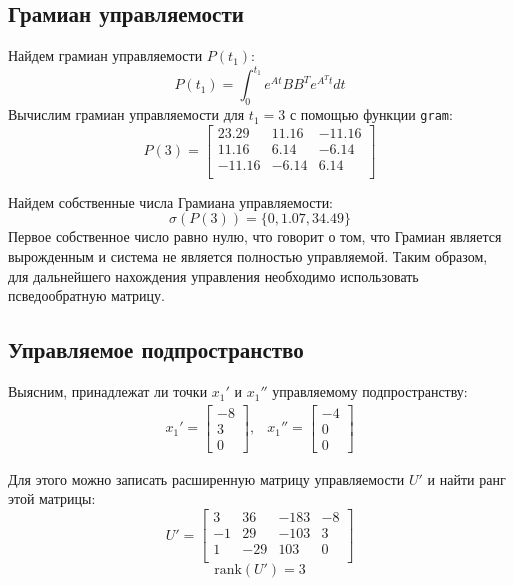 \subsection{Грамиан управляемости}
Найдем грамиан управляемости $P(t_1)$:
\begin{equation}
    P(t_1) = \int_{0}^{t_1} e^{At}BB^Te^{A^Tt}dt
\end{equation}
Вычислим грамиан управляемости для $t_1 = 3$ с помощью функции \texttt{gram}: 
\begin{equation}
    P(3) = \begin{bmatrix}
        23.29 & 11.16 & -11.16 \\ 
        11.16 & 6.14 & -6.14 \\ 
        -11.16 & -6.14 & 6.14 \\ 
    \end{bmatrix}
\end{equation}

Найдем собственные числа Грамиана управляемости:
\begin{equation}
   \sigma(P(3)) = \{0, 1.07, 34.49 \}
\end{equation}
Первое собственное число равно нулю, что говорит о том, что Грамиан является вырожденным и система не является полностью
управляемой. Таким образом, для дальнейшего нахождения управления необходимо использовать псведообратную матрицу. 

\subsection{Управляемое подпространство}
Выясним, принадлежат ли точки $x_1'$ и $x_1''$ управляемому подпространству:
\begin{equation}
    \begin{array}{cc}
        x_1' = \begin{bmatrix}
            -8 \\
            3 \\
            0
        \end{bmatrix}, &
        x_1'' = \begin{bmatrix}
            -4 \\
            0 \\
            0
        \end{bmatrix}
    \end{array}
\end{equation}

Для этого можно записать расширенную матрицу управляемости $U'$ и найти ранг этой матрицы:
\begin{equation}
    U' = \begin{bmatrix}
        3 & 36 & -183 & -8 \\ 
        -1 & 29 & -103 & 3 \\ 
        1 & -29 & 103 & 0 \\ 
    \end{bmatrix}
\end{equation}
\begin{equation}
    \text{rank}(U') = 3
\end{equation}

